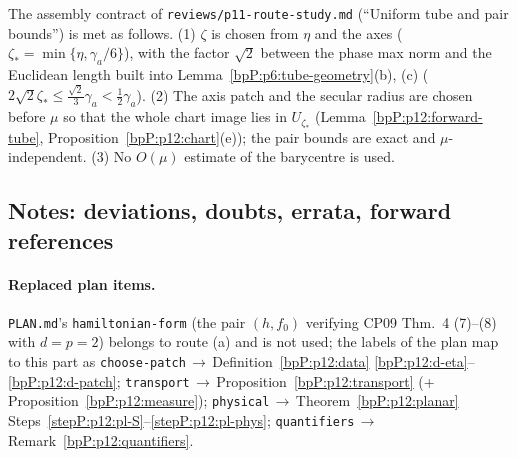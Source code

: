 \begin{remark}\label{bpP:p12:contract}
The assembly contract of \texttt{reviews/p11-route-study.md} (``Uniform tube and pair bounds'') is met as follows. (1) $\zeta$ is chosen from $\eta$ and the axes ($\zeta_*=\min\{\eta,\gamma_a/6\}$), with the factor $\sqrt2$ between the phase max norm and the Euclidean length built into Lemma~\ref{bpP:p6:tube-geometry}(b), (c) ($2\sqrt2\zeta_*\le\frac{\sqrt2}3\gamma_a<\frac12\gamma_a$). (2) The axis patch and the secular radius are chosen before $\mu$ so that the whole chart image lies in $U_{\zeta_*}$ (Lemma~\ref{bpP:p12:forward-tube}, Proposition~\ref{bpP:p12:chart}(e)); the pair bounds are exact and $\mu$-independent. (3) No $O(\mu)$ estimate of the barycentre is used.
\end{remark}

\subsection{Notes: deviations, doubts, errata, forward references}\label{bpP:p12:notes}

\paragraph{Replaced plan items.} \texttt{PLAN.md}'s \texttt{hamiltonian-form} (the pair $(h,f_0)$ verifying CP09 Thm.~4 (7)--(8) with $d=p=2$) belongs to route (a) and is not used; the labels of the plan map to this part as \texttt{choose-patch}\,$\to$\,Definition~\ref{bpP:p12:data} \ref{bpP:p12:d-eta}--\ref{bpP:p12:d-patch}; \texttt{transport}\,$\to$\,Proposition~\ref{bpP:p12:transport} (+ Proposition~\ref{bpP:p12:measure}); \texttt{physical}\,$\to$\,Theorem~\ref{bpP:p12:planar} Steps~\ref{stepP:p12:pl-S}--\ref{stepP:p12:pl-phys}; \texttt{quantifiers}\,$\to$\,Remark~\ref{bpP:p12:quantifiers}.

